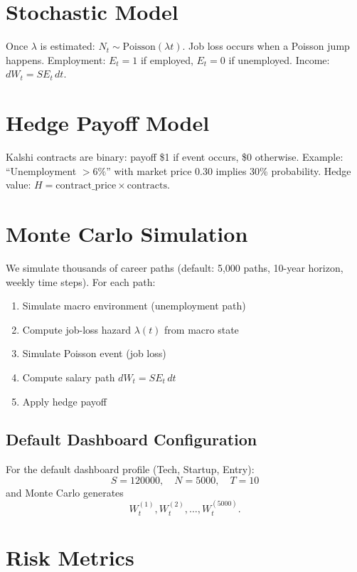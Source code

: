 \documentclass[11pt]{article}
\begin{document}
\section{Stochastic Model}

Once $\lambda$ is estimated: $N_t \sim \text{Poisson}(\lambda t)$. Job loss occurs when 
a Poisson jump happens. Employment: $E_t = 1$ if employed, $E_t = 0$ if unemployed.
Income: $dW_t = S E_t \, dt$.

\section{Hedge Payoff Model}

Kalshi contracts are binary: payoff \$1 if event occurs, \$0 otherwise. Example: 
``Unemployment $> 6\%$'' with market price 0.30 implies 30\% probability. 
Hedge value: $H = \text{contract\_price} \times \text{contracts}$.

\section{Monte Carlo Simulation}

We simulate thousands of career paths (default: 5,000 paths, 10-year horizon,
weekly time steps). For each path:

\begin{enumerate}
\item Simulate macro environment (unemployment path)
\item Compute job-loss hazard $\lambda(t)$ from macro state
\item Simulate Poisson event (job loss)
\item Compute salary path $dW_t = S E_t \, dt$
\item Apply hedge payoff
\end{enumerate}

\subsection{Default Dashboard Configuration}

For the default dashboard profile (Tech, Startup, Entry):
\[
S = 120000,\quad N = 5000,\quad T = 10
\]
and Monte Carlo generates
\[
W_t^{(1)}, W_t^{(2)}, \ldots, W_t^{(5000)}.
\]

\section{Risk Metrics}
\end{document}
